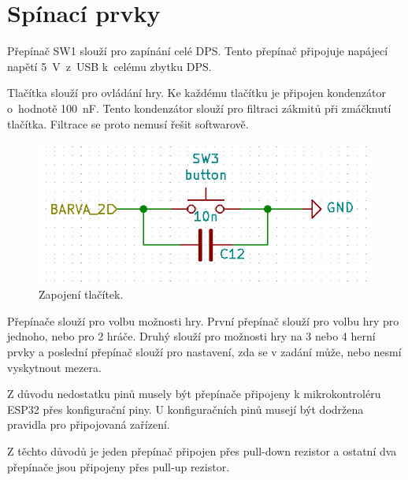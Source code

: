   \section{Spínací prvky}
  Přepínač SW1 slouží pro zapínání celé DPS. Tento přepínač připojuje napájecí napětí 5~V~z~USB k~celému zbytku DPS. 

  Tlačítka slouží pro ovládání hry. Ke každému tlačítku je připojen kondenzátor o~hodnotě 100~nF. Tento kondenzátor 
  slouží pro filtraci zákmitů při zmáčknutí tlačítka. Filtrace se proto nemusí řešit softwarově.

  \begin{figure}[!h]
    \begin{center}
      \includegraphics[scale=0.8]{obrazky/Tlacitka_zapojeni.png}
    \end{center}
    \caption[Zapojení tlačítek]{Zapojení tlačítek.}
  \end{figure}

  Přepínače slouží pro volbu možnosti hry. První přepínač slouží pro volbu hry pro jednoho, nebo pro 2 hráče. Druhý 
  slouží pro možnosti hry na 3 nebo 4 herní prvky a poslední přepínač slouží pro nastavení, zda se v zadání může, nebo 
  nesmí vyskytnout mezera. 
  
  Z důvodu nedostatku pinů musely být přepínače připojeny k mikrokontroléru ESP32 přes konfigurační piny. U konfiguračních pinů
  musejí být dodržena pravidla pro připojovaná zařízení.  %
  
  Z těchto důvodů je jeden přepínač připojen přes pull-down rezistor a ostatní dva přepínače jsou připojeny přes pull-up rezistor. 

